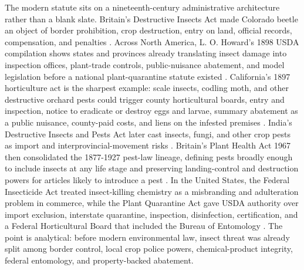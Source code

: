 \documentclass[
  english,
]{article}
\begin{document}
The modern statute sits on a nineteenth-century administrative
architecture rather than a blank slate. Britain's Destructive Insects
Act made Colorado beetle an object of border prohibition, crop
destruction, entry on land, official records, compensation, and
penalties \citep{destructive_insects1877}. Across North America, L. O.
Howard's 1898 USDA compilation shows states and provinces already
translating insect damage into inspection offices, plant-trade controls,
public-nuisance abatement, and model legislation before a national
plant-quarantine statute existed
\citep{howard1898_injurious_insect_laws}. California's 1897 horticulture
act is the sharpest example: scale insects, codling moth, and other
destructive orchard pests could trigger county horticultural boards,
entry and inspection, notice to eradicate or destroy eggs and larvae,
summary abatement as a public nuisance, county-paid costs, and liens on
the infested premises \citep{california_horticulture1897}. India's
Destructive Insects and Pests Act later cast insects, fungi, and other
crop pests as import and interprovincial-movement risks
\citep{india_destructive_insects1914}. Britain's Plant Health Act 1967
then consolidated the 1877-1927 pest-law lineage, defining pests broadly
enough to include insects at any life stage and preserving
landing-control and destruction powers for articles likely to introduce
a pest \citep{uk_plant_health1967}. In the United States, the Federal
Insecticide Act treated insect-killing chemistry as a misbranding and
adulteration problem in commerce, while the Plant Quarantine Act gave
USDA authority over import exclusion, interstate quarantine, inspection,
disinfection, certification, and a Federal Horticultural Board that
included the Bureau of Entomology
\citep{federal_insecticide1910, plant_quarantine1912}. The point is
analytical: before modern environmental law, insect threat was already
split among border control, local crop police powers, chemical-product
integrity, federal entomology, and property-backed abatement.
\end{document}

